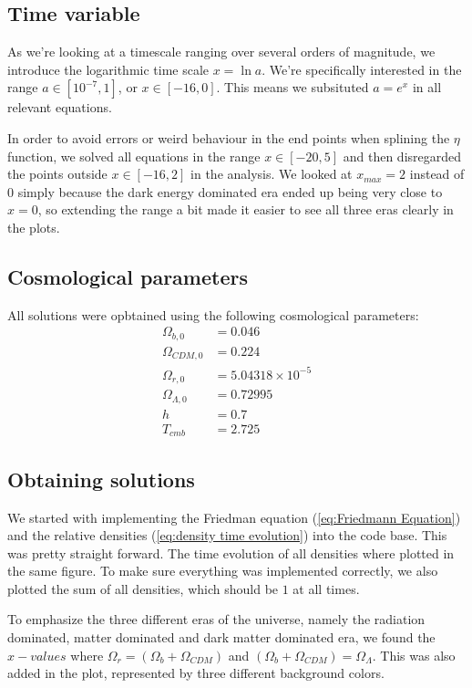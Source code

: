 \documentclass[12pt]{article}
\begin{document}
\subsection{Time variable}
As we're looking at a timescale ranging over several orders of magnitude, we introduce the logarithmic time scale $x = \ln{a}$. We're specifically interested in the range $a\in [10^{-7},1]$, or $x \in [-16,0]$. This means we subsituted $a = e^x$ in all relevant equations. 

In order to avoid errors or weird behaviour in the end points when splining the $\eta$ function, we solved all equations in the range $x \in [-20,5]$ and then disregarded the points outside $x \in [-16,2]$ in the analysis. We looked at $x_{max} = 2$ instead of $0$ simply because the dark energy dominated era ended up being very close to $x=0$, so extending the range a bit made it easier to see all three eras clearly in the plots. 

\subsection{Cosmological parameters}
All solutions were opbtained using the following cosmological parameters: 
\begin{align*}
    \Omega_{b,0} &= 0.046\\
    \Omega_{CDM,0} &= 0.224\\
    \Omega_{r,0} &= 5.04318\times 10^{-5}\\
    \Omega_{\Lambda,0} &= 0.72995 \\
    h &= 0.7 \\
    T_{cmb} &= 2.725
\end{align*}

\subsection{Obtaining solutions}
We started with implementing the Friedman equation (\cref{eq:Friedmann Equation}) and the relative densities (\cref{eq:density time evolution}) into the code base. This was pretty straight forward. The time evolution of all densities where plotted in the same figure. To make sure everything was implemented correctly, we also plotted the sum of all densities, which should be $1$ at all times. 

To emphasize the three different eras of the universe, namely the radiation dominated, matter dominated and dark matter dominated era, we found the $x-values$ where $\Omega_r = (\Omega_b + \Omega_{CDM})$ and $(\Omega_b + \Omega_{CDM}) = \Omega_{\Lambda}$. This was also added in the plot, represented by three different background colors.
\end{document}

